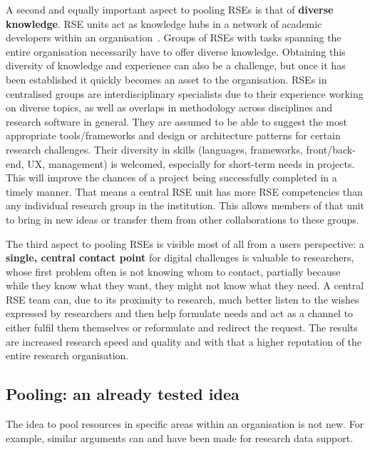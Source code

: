 \documentclass[a4paper]{article}
\begin{document}
A second and equally important aspect to pooling RSEs is that of \textbf{diverse knowledge}.
RSE units act as knowledge hubs in a network of academic developers within an organisation~\autocite{Elsholz2006}.
Groups of RSEs with tasks spanning the entire organisation necessarily have to offer diverse knowledge.
Obtaining this diversity of knowledge and experience can also be a challenge, but once it has been established it quickly becomes an asset to the organisation.
RSEs in centralised groups are interdisciplinary specialists due to their experience working on diverse topics,  as well as overlaps in methodology across disciplines and research software in general.
They are assumed to be able to suggest the most appropriate tools/frameworks and design or architecture patterns for certain research challenges.
Their diversity in skills (languages, frameworks, front/back-end, UX, management) is welcomed, especially for short-term needs in projects.
This will improve the chances of a project being successfully completed in a timely manner.
That means a central RSE unit has more RSE competencies than any individual research group in the institution.
This allows members of that unit to bring in new ideas or transfer them from other collaborations to these groups.

The third aspect to pooling RSEs is visible most of all from a users perspective: a \textbf{single, central contact point} for digital challenges is valuable to researchers, whose first problem often is not knowing whom to contact, partially because while they know what they want, they might not know what they need.
A central RSE team can, due to its proximity to research, much better listen to the wishes expressed by researchers and then help formulate needs and act as a channel to either fulfil them themselves or reformulate and redirect the request.
The results are increased research speed and quality and with that a higher reputation of the entire research organisation.

\subsection{Pooling: an already tested idea}
The idea to pool resources in specific areas within an organisation is not new.
For example, similar arguments can and have been made for research data support.
\end{document}
